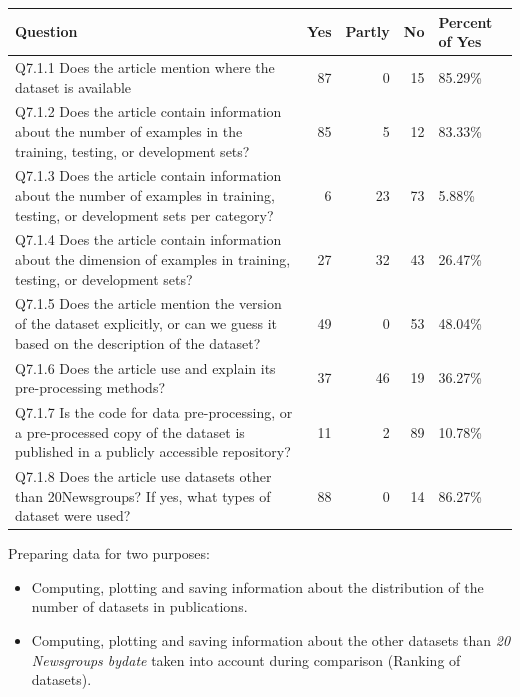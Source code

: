 \documentclass[
]{article}
\providecommand{\tightlist}{%
  \setlength{\itemsep}{0pt}\setlength{\parskip}{0pt}}
\begin{document}
\begin{tabular}{l|r|r|r|l}
\hline
Question & Yes & Partly & No & Percent of Yes\\
\hline
Q7.1.1 Does the article mention where the dataset is available & 87 & 0 & 15 & 85.29\%\\
\hline
Q7.1.2 Does the article contain information about the number of examples in the training, testing, or development sets? & 85 & 5 & 12 & 83.33\%\\
\hline
Q7.1.3 Does the article contain information about the number of examples in training, testing, or development sets per category? & 6 & 23 & 73 & 5.88\%\\
\hline
Q7.1.4 Does the article contain information about the dimension of examples in training, testing, or development sets? & 27 & 32 & 43 & 26.47\%\\
\hline
Q7.1.5 Does the article mention the version of the dataset explicitly, or can we guess it based on the description of the dataset? & 49 & 0 & 53 & 48.04\%\\
\hline
Q7.1.6 Does the article use and explain its pre-processing methods? & 37 & 46 & 19 & 36.27\%\\
\hline
Q7.1.7 Is the code for data pre-processing, or a pre-processed copy of the dataset is published in a publicly accessible repository? & 11 & 2 & 89 & 10.78\%\\
\hline
Q7.1.8 Does the article use datasets other than 20Newsgroups? If yes, what types of dataset were used? & 88 & 0 & 14 & 86.27\%\\
\hline
\end{tabular}

Preparing data for two purposes:

\begin{itemize}
\tightlist
\item
  Computing, plotting and saving information about the distribution of the number of datasets in publications.
\item
  Computing, plotting and saving information about the other datasets than \emph{20 Newsgroups bydate} taken into account during comparison (Ranking of datasets).
\end{itemize}
\end{document}
